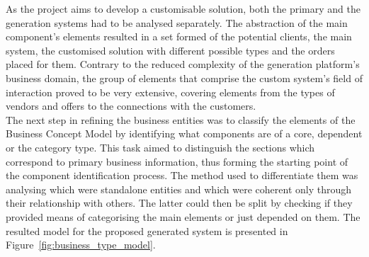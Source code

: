 As the project aims to develop a customisable solution, both the primary and the generation systems had to be analysed separately. The abstraction of the main component's elements resulted in a set formed of the potential clients, the main system, the customised solution with different possible types and the orders placed for them. Contrary to the reduced complexity of the generation platform's business domain, the group of elements that comprise the custom system's field of interaction proved to be very extensive, covering elements from the types of vendors and offers to the connections with the customers.\\  

The next step in refining the business entities was to classify the elements of the Business Concept Model by identifying what components are of a core, dependent or the category type. This task aimed to distinguish the sections which correspond to primary business information, thus forming the starting point of the component identification process. The method used to differentiate them was analysing which were standalone entities and which were coherent only through their relationship with others. The latter could then be split by checking if they provided means of categorising the main elements or just depended on them. The resulted model for the proposed generated system is presented in Figure~\ref{fig:business_type_model}.\\

